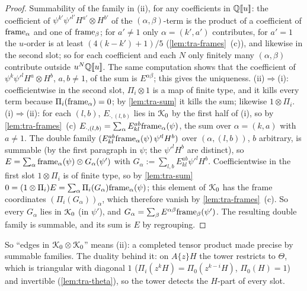\begin{proof}
Summability of the family in (ii), for any coefficients in $\mathbb{Q}[\![ u ]\!]$: the coefficient of $\psi^{k'}\psi'^{l'}H^{a'}\otimes H^{b'}$ of the $(\alpha,\beta)$-term is the product of a coefficient of $\mathrm{frame}_\alpha$ and one of $\mathrm{frame}_\beta$; for $a'\neq 1$ only $\alpha = (k',a')$ contributes, for $a' = 1$ the $u$-order is at least $(4(k-k')+1)/5$ (\cref{lem:tra-frames}~(c)), and likewise in the second slot; so for each coefficient and each $N$ only finitely many $(\alpha,\beta)$ contribute outside $u^N\mathbb{Q}[\![ u ]\!]$. The same computation shows that the coefficient of $\psi^k\psi'^lH^a\otimes H^b$, $a,b\neq 1$, of the sum is $E^{\alpha\beta}$; this gives the uniqueness.
(ii)$\Rightarrow$(i): coefficientwise in the second slot, $\Pi_i\otimes 1$ is a map of finite type, and it kills every term because $\Pi_i(\mathrm{frame}_\alpha) = 0$; by \cref{lem:tra-sum} it kills the sum; likewise $1\otimes\Pi_i$.
(i)$\Rightarrow$(ii): for each $(l,b)$, $E_{\cdot,(l,b)}$ lies in $\mathcal{K}_{0}$ by the first half of (i), so by \cref{lem:tra-frames}~(c) $E_{\cdot,(l,b)} = \sum_\alpha E^{ab}_{kl}\mathrm{frame}_\alpha(\psi)$, the sum over $\alpha = (k,a)$ with $a\neq 1$. The double family $(E^{ab}_{kl}\mathrm{frame}_\alpha(\psi)\,\psi'^lH^b)$ over $(\alpha,(l,b))$, $b$ arbitrary, is summable (by the first paragraph in $\psi$; the $\psi'^lH^b$ are distinct), so $E = \sum_\alpha\mathrm{frame}_\alpha(\psi)\otimes G_\alpha(\psi')$ with $G_\alpha := \sum_{l,b}E^{ab}_{kl}\psi'^lH^b$. Coefficientwise in the first slot $1\otimes\Pi_i$ is of finite type, so by \cref{lem:tra-sum} $0 = (1\otimes\Pi_i)E = \sum_\alpha\Pi_i(G_\alpha)\mathrm{frame}_\alpha(\psi)$; this element of $\mathcal{K}_{0}$ has the frame coordinates $(\Pi_i(G_\alpha))_\alpha$, which therefore vanish by \cref{lem:tra-frames}~(c). So every $G_\alpha$ lies in $\mathcal{K}_{0}$ (in $\psi'$), and $G_\alpha = \sum_\beta E^{\alpha\beta}\mathrm{frame}_\beta(\psi')$. The resulting double family is summable, and its sum is $E$ by regrouping.
\end{proof}

So ``edges in $\mathcal{K}_{0}\otimes\mathcal{K}_{0}$'' means (ii): a completed tensor product made precise by summable families. The duality behind it: on $A\{z\}H$ the tower restricts to $\Theta$, which is triangular with diagonal $1$ ($\Pi_i(z^kH) = \Pi_0(z^{k-i}H)$, $\Pi_0(H) = 1$) and invertible (\cref{lem:tra-theta}), so the tower detects the $H$-part of every slot.


